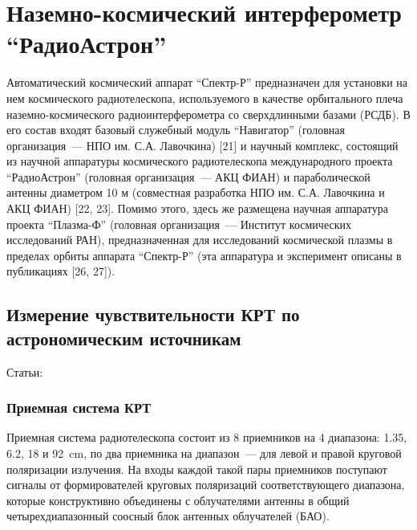 \chapter{Наземно-космический интерферометр ``РадиоАстрон''} \label{chapt2}

Автоматический космический аппарат ``Спектр-Р'' предназначен для установки на нем космического
радиотелескопа, используемого в качестве орбитального плеча наземно-космического
радиоинтерферометра со сверхдлинными базами (РСДБ). В его состав входят базовый служебный модуль
``Навигатор'' (головная организация~--- НПО им. С.А. Лавочкина) [21] и научный комплекс, состоящий
из научной аппаратуры космического радиотелескопа международного проекта ``РадиоАстрон'' (головная
организация~--- АКЦ ФИАН) и параболической антенны диаметром 10 м (совместная разработка НПО им.
С.А. Лавочкина и АКЦ ФИАН) [22, 23]. Помимо этого, здесь же размещена научная аппаратура проекта
``Плазма-Ф'' (головная организация~--- Институт космических исследований РАН), предназначенная для
исследований космической плазмы в пределах орбиты аппарата ``Спектр-Р'' (эта аппаратура и
эксперимент описаны в публикациях [26, 27]).



\section{Измерение чувствительности КРТ по астрономическим источникам}

Статьи: \cite{Kardashev_2013_rus, Kovalev_2014_rus}

\subsection{Приемная система КРТ}

Приемная система радиотелескопа состоит из 8 приемников на 4 диапазона: 1.35, 6.2, 18 и
\SI{92}{\cm}, по два приемника на диапазон~--- для левой и правой круговой поляризации излучения. На
входы каждой такой пары приемников поступают сигналы от формирователей круговых поляризаций
соответствующего диапазона, которые конструктивно объединены с облучателями антенны в общий
четырехдиапазонный соосный блок антенных облучателей (БАО).

